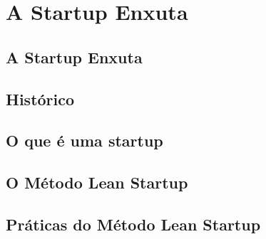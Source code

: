 \section{A Startup Enxuta}


\subsection{A Startup Enxuta}
\subsection{Histórico}
\subsection{O que é uma startup}
\subsection{O Método Lean Startup}
\subsection{Práticas do Método Lean Startup}
